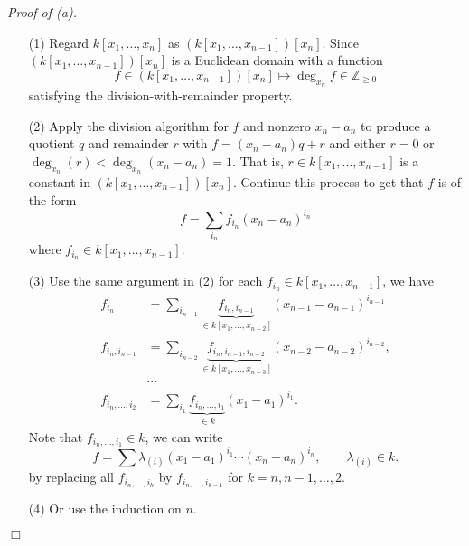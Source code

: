 \documentclass{article}
\begin{document}
\emph{Proof of (a).}
\begin{enumerate}
\item[(1)]
  Regard $k[x_1, \ldots, x_n]$ as $(k[x_1, \ldots, x_{n-1}])[x_n]$.
  Since $(k[x_1, \ldots, x_{n-1}])[x_n]$ is a Euclidean domain with a function
  \[
    f \in (k[x_1, \ldots, x_{n-1}])[x_n] \mapsto \deg_{x_n} f \in \mathbb{Z}_{\geq 0}
  \]
  satisfying the division-with-remainder property.

\item[(2)]
  Apply the division algorithm for $f$ and nonzero $x_n-a_n$
  to produce a quotient $q$ and remainder $r$ with
  $f = (x_n-a_n) q + r$ and either $r = 0$ or $\deg_{x_n}(r) < \deg_{x_n} (x_n-a_n) = 1$.
  That is, $r \in k[x_1, \ldots, x_{n-1}]$ is a constant in $(k[x_1, \ldots, x_{n-1}])[x_n]$.
  Continue this process to get that $f$ is of the form
  \[
    f = \sum_{i_n} f_{i_n} (x_n - a_n)^{i_n}
  \]
  where $f_{i_n} \in k[x_1, \ldots, x_{n-1}]$.

\item[(3)]
  Use the same argument in (2) for each $f_{i_n} \in k[x_1, \ldots, x_{n-1}]$, we have
  \begin{align*}
    f_{i_n}
    &= \sum_{i_{n-1}} \underbrace{f_{i_n,i_{n-1}}}_{\in k[x_1, \ldots, x_{n-2}]}
      (x_{n-1} - a_{n-1})^{i_{n-1}} \\
    f_{i_n,i_{n-1}}
    &=
    \sum_{i_{n-2}} \underbrace{f_{i_n,i_{n-1},i_{n-2}}}_{\in k[x_1, \ldots, x_{n-3}]}
      (x_{n-2} - a_{n-2})^{i_{n-2}}, \\
    & \cdots \\
    f_{i_n,\ldots,i_{2}}
    &= \sum_{i_1} \underbrace{f_{i_n,\ldots,i_1}}_{\in k} (x_1 - a_1)^{i_1}.
  \end{align*}
  Note that $f_{i_n,\ldots,i_1} \in k$, we can write
  \[
    f = \sum \lambda_{(i)} (x_1-a_1)^{i_1} \cdots (x_n-a_n)^{i_n},
    \qquad
    \lambda_{(i)} \in k.
  \]
  by replacing all $f_{i_n,\ldots,i_k}$ by $f_{i_n,\ldots,i_{k-1}}$
  for $k = n, n-1, \ldots, 2$.

\item[(4)]
  Or use the induction on $n$.
\end{enumerate}
$\Box$ \\
\end{document}
